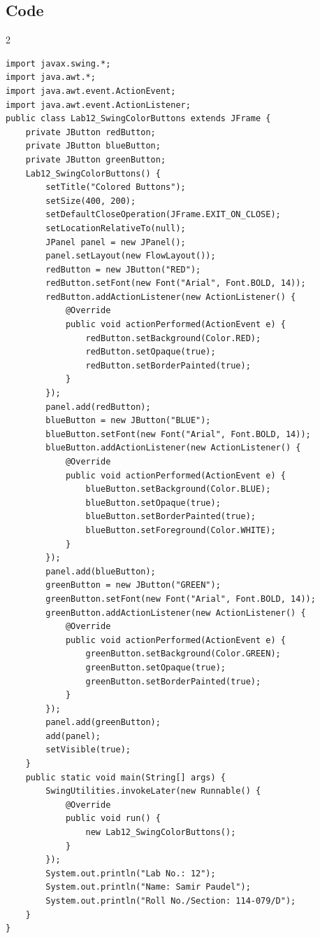 \documentclass[10pt,a4paper]{article}
\begin{document}
\subsection*{Code}
\begin{multicols}{2}
\begin{lstlisting}
import javax.swing.*;
import java.awt.*;
import java.awt.event.ActionEvent;
import java.awt.event.ActionListener;
public class Lab12_SwingColorButtons extends JFrame {
    private JButton redButton;
    private JButton blueButton;
    private JButton greenButton;
    Lab12_SwingColorButtons() {
        setTitle("Colored Buttons");
        setSize(400, 200);
        setDefaultCloseOperation(JFrame.EXIT_ON_CLOSE);
        setLocationRelativeTo(null);
        JPanel panel = new JPanel();
        panel.setLayout(new FlowLayout());
        redButton = new JButton("RED");
        redButton.setFont(new Font("Arial", Font.BOLD, 14));
        redButton.addActionListener(new ActionListener() {
            @Override
            public void actionPerformed(ActionEvent e) {
                redButton.setBackground(Color.RED);
                redButton.setOpaque(true);
                redButton.setBorderPainted(true);
            }
        });
        panel.add(redButton);
        blueButton = new JButton("BLUE");
        blueButton.setFont(new Font("Arial", Font.BOLD, 14));
        blueButton.addActionListener(new ActionListener() {
            @Override
            public void actionPerformed(ActionEvent e) {
                blueButton.setBackground(Color.BLUE);
                blueButton.setOpaque(true);
                blueButton.setBorderPainted(true);
                blueButton.setForeground(Color.WHITE);
            }
        });
        panel.add(blueButton);
        greenButton = new JButton("GREEN");
        greenButton.setFont(new Font("Arial", Font.BOLD, 14));
        greenButton.addActionListener(new ActionListener() {
            @Override
            public void actionPerformed(ActionEvent e) {
                greenButton.setBackground(Color.GREEN);
                greenButton.setOpaque(true);
                greenButton.setBorderPainted(true);
            }
        });
        panel.add(greenButton);
        add(panel);
        setVisible(true);
    }
    public static void main(String[] args) {
        SwingUtilities.invokeLater(new Runnable() {
            @Override
            public void run() {
                new Lab12_SwingColorButtons();
            }
        });
        System.out.println("Lab No.: 12");
        System.out.println("Name: Samir Paudel");
        System.out.println("Roll No./Section: 114-079/D");
    }
}
\end{lstlisting}
\end{multicols}
\end{document}
